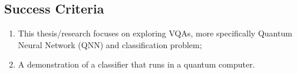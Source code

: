 \subsection{Success Criteria}
\begin{enumerate}
    \item This thesis/research focuses on exploring VQAs, more specifically Quantum Neural Network (QNN) and classification problem;
    \item A demonstration of a classifier that runs in a quantum computer.
\end{enumerate}

